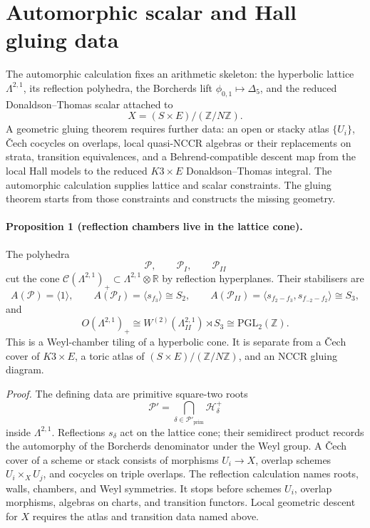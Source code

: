 \providecommand{\kBKM}{\kappa_{\mathrm{BKM}}}
\providecommand{\kch}{\kappa_{\mathrm{ch}}}
\providecommand{\kcat}{\kappa_{\mathrm{cat}}}
\providecommand{\kfib}{\kappa_{\mathrm{fiber}}}
\providecommand{\Hilb}{\mathrm{Hilb}}
\providecommand{\DT}{\mathrm{DT}}
\providecommand{\cP}{\mathcal{P}}
\providecommand{\cC}{\mathcal{C}}
\providecommand{\HH}{\mathbb{H}}
\providecommand{\Z}{\mathbb{Z}}
\providecommand{\Pone}{\mathbb{P}^{1}}
\providecommand{\CoHA}{\mathrm{CoHA}}
\providecommand{\SpCh}{\mathrm{Sp}^{\mathrm{ch}}}
\providecommand{\PhiFA}{\Phi^{\mathrm{FA}}}

\section*{Automorphic scalar and Hall gluing data}

The automorphic calculation fixes an arithmetic skeleton: the
hyperbolic lattice $\Lambda^{2,1}$, its reflection polyhedra, the
Borcherds lift $\phi_{0,1}\mapsto\Delta_5$, and the reduced
Donaldson--Thomas scalar attached to
\[
 X=(S\times E)/(\Z/N\Z).
\]
A geometric gluing theorem requires further data: an open or stacky
atlas $\{U_i\}$, \v{C}ech cocycles on overlaps, local quasi-NCCR
algebras or their replacements on strata, transition equivalences, and
a Behrend-compatible descent map from the local Hall models to the
reduced $K3\times E$ Donaldson--Thomas integral. The automorphic
calculation supplies lattice and scalar constraints. The gluing theorem
starts from those constraints and constructs the missing geometry.

\paragraph{Proposition 1 (reflection chambers live in the lattice cone).}
The polyhedra
\[
\cP,\qquad \cP_I,\qquad \cP_{II}
\]
cut the cone
$\cC(\Lambda^{2,1})_+\subset\Lambda^{2,1}\otimes\mathbb R$ by
reflection hyperplanes. Their stabilisers are
\[
A(\cP)=\langle 1\rangle,\qquad
A(\cP_I)=\langle s_{f_3}\rangle\cong S_2,\qquad
A(\cP_{II})=\langle s_{f_2-f_3},s_{f_{-2}-f_2}\rangle\cong S_3,
\]
and
\[
O(\Lambda^{2,1})_+\cong W^{(2)}(\Lambda^{2,1}_{II})\rtimes S_3
\cong \mathrm{PGL}_2(\Z).
\]
This is a Weyl-chamber tiling of a hyperbolic cone. It is separate
from a \v{C}ech cover of $K3\times E$, a toric atlas of
$(S\times E)/(\Z/N\Z)$, and an NCCR gluing diagram.

\emph{Proof.}
The defining data are primitive square-two roots
\[
\cP'=\bigcap_{\delta\in\cP'_{\mathrm{prim}}}\mathcal H^+_\delta
\]
inside $\Lambda^{2,1}$. Reflections $s_\delta$ act on the lattice cone;
their semidirect product records the automorphy of the Borcherds
denominator under the Weyl group. A \v{C}ech cover of a scheme or
stack consists of morphisms $U_i\to X$, overlap schemes
$U_i\times_X U_j$, and cocycles on triple overlaps. The reflection
calculation names roots, walls, chambers, and Weyl symmetries. It
stops before schemes $U_i$, overlap morphisms, algebras on charts, and
transition functors. Local geometric descent for $X$ requires the atlas
and transition data named above.

